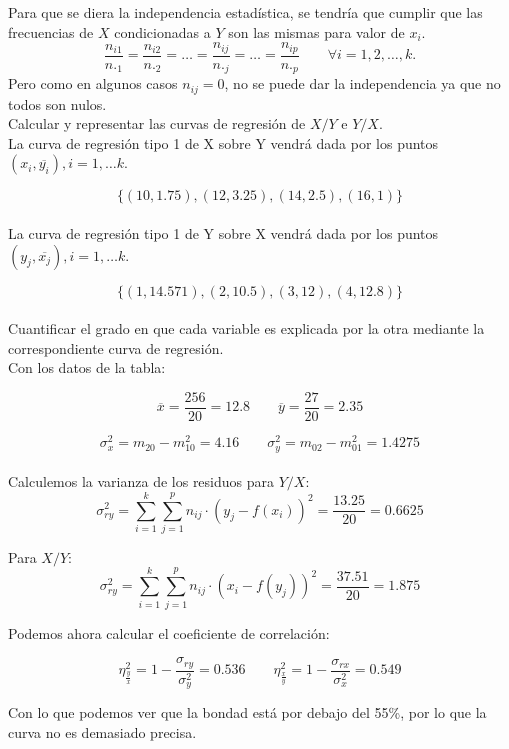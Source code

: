 Para que se diera la independencia estadística, se tendría que cumplir que las frecuencias de $X$ condicionadas a $Y$ son las mismas para valor de $x_i$. 
$$ \dfrac{n_{i1}}{n._1}=\dfrac{n_{i2}}{n._2}= \dots = \dfrac{n_{ij}}{n._j} = \dots = \dfrac{n_{ip}}{n._p} \qquad \forall i = 1,2,\dots , k.$$
Pero como en algunos casos $n_{ij} = 0$, no se puede dar la independencia ya que no todos son nulos.\\

\subproblem Calcular y representar las curvas de regresión de $X/Y$ e $Y/X$.\\

La curva de regresión tipo 1 de X sobre Y vendrá dada por los puntos $(x_i, \overline{y_i}), i = 1, \dots k$.

$$\{(10, 1.75), (12, 3.25), (14, 2.5), (16, 1)\}$$\\


La curva de regresión tipo 1 de Y sobre X vendrá dada por los puntos $(y_j, \overline{x_j}), i = 1, \dots k$.

$$\{(1, 14.571), (2, 10.5), (3, 12), (4, 12.8) \}$$\\

\subproblem
Cuantificar el grado en que cada variable es explicada por la otra mediante la correspondiente curva de regresión. \\

Con los datos de la tabla:

$$\overline{x} = \dfrac{256}{20} = 12.8 \qquad \overline{y} = \dfrac{27}{20} = 2.35 $$

$$ \sigma_x^2 = m_{20} - m_{10}^2= 4.16 \qquad \sigma_y^2 = m_{02} - m_{01}^2= 1.4275 $$ \\

Calculemos la varianza de los residuos para $Y/X$:
$$\sigma_{ry}^2 = \sum_{i=1}^{k}\sum_{j=1}^p n_{ij}\cdot(y_j-f(x_i))^2 = \dfrac{13.25}{20} = 0.6625 $$

Para $X/Y$:
$$\sigma_{ry}^2 = \sum_{i=1}^{k}\sum_{j=1}^p n_{ij}\cdot(x_i-f(y_j))^2 = \dfrac{37.51}{20} = 1.875 $$

Podemos ahora calcular el coeficiente de correlación:

$$\eta_{\frac{y}{x}}^2 = 1 - \dfrac{\sigma_{ry}}{\sigma_y^2} = 0.536 \qquad 
\eta_{\frac{x}{y}}^2 = 1 - \dfrac{\sigma_{rx}}{\sigma_x^2} = 0.549 $$

Con lo que podemos ver que la bondad está por debajo del 55\%, por lo que la curva no es demasiado precisa. \\
\\

